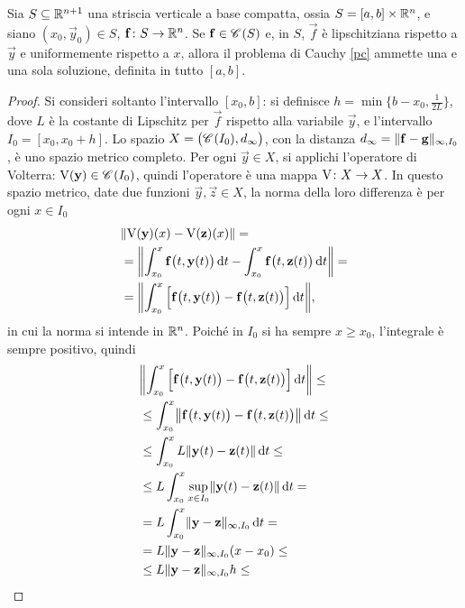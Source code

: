 \begin{teorema} \label{t:E-globale}
	Sia $S\subseteq\R^{n+1}$ una striscia verticale a base compatta, ossia $S=[a,b]\times\R^n$, e siano $(x_0,\vec y_0)\in S$, $\vec f\colon S\to\R^n$. Se $\vec f\in\cont{S}$ e, in $S$, $\vec f$ è lipschitziana rispetto a $\vec y$ e uniformemente rispetto a $x$, allora il problema di Cauchy \eqref{pc} ammette una e una sola soluzione, definita in tutto $[a,b]$.
\end{teorema}
\begin{proof}
Si consideri soltanto l'intervallo $[x_0,b]$: si definisce $h=\min\{b-x_0,\frac1{2L}\}$, dove $L$ è la costante di Lipschitz per $\vec f$ rispetto alla variabile $\vec y$, e l'intervallo $I_0=[x_0,x_0+h]$. Lo spazio $X=\big(\cont{I_0},d_\infty\big)$, con la distanza $d_{\infty}=\norm{\vec f-\vec g}_{\infty,I_0}$, è uno spazio metrico completo. Per ogni $\vec y\in X$, si applichi l'operatore di Volterra: $\volterra(\vec y)\in\cont{I_0}$, quindi l'operatore è una mappa $\volterra\colon X\to X$. In questo spazio metrico, date due funzioni $\vec y,\vec z\in X$, la norma della loro differenza è per ogni $x\in I_0$
\begin{align*}
&\norm{\volterra(\vec y)(x)-\volterra(\vec z)(x)}=\\
&=\norm[\bigg]{\int_{x_0}^x\vec f\big(t,\vec y(t)\big)\,\dd t-\int_{x_0}^x\vec f\big(t,\vec z(t)\big)\,\dd t}=\\
&=\norm[\bigg]{\int_{x_0}^x\Big[\vec f\big(t,\vec y(t)\big)-\vec f\big(t,\vec z(t)\big)\Big]\,\dd t},
\end{align*}
in cui la norma si intende in $\R^n$. Poiché in $I_0$ si ha sempre $x\geq x_0$, l'integrale è sempre positivo, quindi
\begin{align*}
	&\norm[\bigg]{\int_{x_0}^x\Big[\vec f\big(t,\vec y(t)\big)-\vec f\big(t,\vec z(t)\big)\Big]\,\dd t}\leq\\
	&\leq\int_{x_0}^x\norm[\big]{\vec f\big(t,\vec y(t)\big)-\vec f\big(t,\vec z(t)\big)}\,\dd t\leq\\
	&\leq\int_{x_0}^xL\norm{\vec y(t)-\vec z(t)}\,\dd t\leq\\
	&\leq L\int_{x_0}^x\sup_{x\in I_0}\norm{\vec y(t)-\vec z(t)}\,\dd t=\\
	&=L\int_{x_0}^x\norm{\vec y-\vec z}_{\infty,I_0}\,\dd t=\\
	&=L\norm{\vec y-\vec z}_{\infty,I_0}(x-x_0)\leq\\
	&\leq L\norm{\vec y-\vec z}_{\infty,I_0}h\leq\\

\end{align*}
\end{proof}
